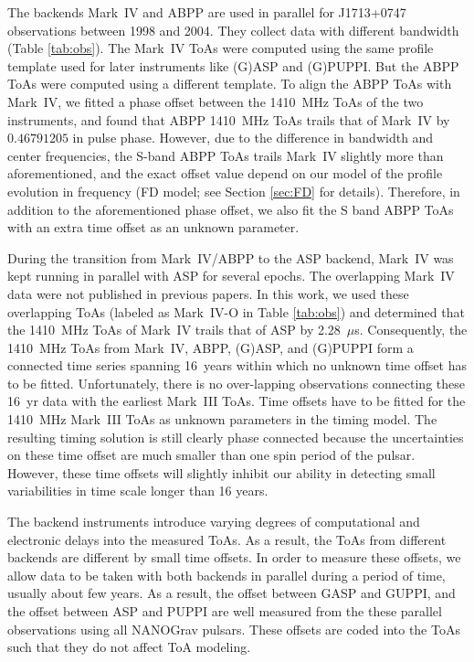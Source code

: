 The backends Mark~IV and ABPP are used in parallel for J1713+0747 
observations between 1998 and 2004. They collect data with different bandwidth (Table
\ref{tab:obs}). The Mark~IV ToAs were computed using
the same profile template used for later instruments like (G)ASP and (G)PUPPI. 
But the ABPP ToAs were computed using a different template.
To align the ABPP ToAs with Mark~IV, we
fitted a phase offset between the 1410~MHz ToAs of the two instruments, and found
that ABPP 1410~MHz ToAs trails that of Mark~IV by $0.46791205$ in pulse phase.
However, due to the difference in bandwidth and center frequencies, the S-band
ABPP ToAs trails Mark~IV slightly more than aforementioned, and the exact
offset value depend on our model of the profile evolution in frequency (FD
model; see Section \ref{sec:FD} for details). Therefore, in
addition to the aforementioned phase offset, we also 
fit the S band ABPP ToAs with an extra time offset as an unknown parameter.

During the transition from Mark~IV/ABPP to the ASP backend, Mark~IV
was kept running in parallel with ASP for several epochs. 
The overlapping Mark~IV data were not published in previous papers. 
In this work, we used these overlapping ToAs (labeled as Mark~IV-O in Table \ref{tab:obs}) 
and determined that the 1410~MHz ToAs of Mark~IV trails that of ASP by
2.28~$\mu$s. Consequently, the
1410~MHz ToAs from Mark~IV, ABPP, (G)ASP, and (G)PUPPI form a connected time
series spanning 16~years within which no unknown time offset has to be fitted. 
Unfortunately, there is no
over-lapping observations connecting these 16~yr data with the earliest  Mark~III ToAs. 
Time offsets have to be
fitted for the 1410~MHz Mark~III ToAs as unknown parameters in the timing
model. The resulting timing solution is still
clearly phase connected because the uncertainties on these time offset are
much
smaller than one spin period of the pulsar. However, these time offsets will
slightly inhibit our ability in detecting small variabilities in time scale longer 
than 16 years.

The backend instruments introduce varying degrees of computational
and electronic delays into the measured ToAs. 
As a result, the ToAs from different backends are different by small time
offsets.
In order to measure these offsets, we allow data to be taken 
with both backends in parallel during a period of time, usually about few years.
As a result, the offset between GASP and GUPPI, and the offset between ASP and
PUPPI are well measured from the these parallel observations using all NANOGrav
pulsars. These offsets are coded into the ToAs such that they do not affect
ToA modeling. 




